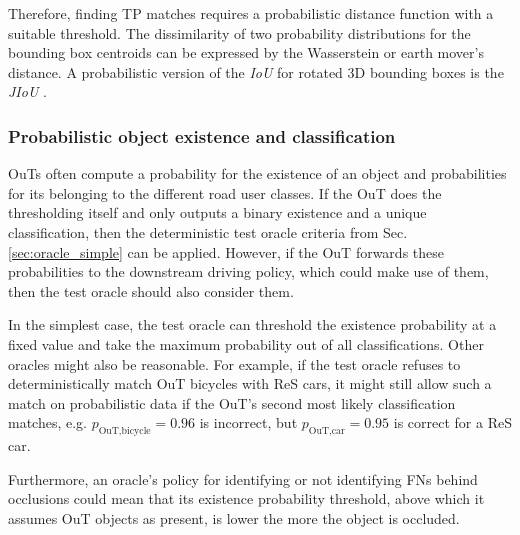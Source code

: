 \documentclass[conference]{IEEEtran}
\begin{document}
Therefore, finding TP matches requires a probabilistic distance function with a suitable threshold. 
The dissimilarity of two probability distributions for the bounding box centroids can be expressed by the Wasserstein or earth mover's distance.
A probabilistic version of the \textit{IoU} for rotated 3D bounding boxes is the \textit{JIoU} \cite{Wang2020inferring_iros}.

\subsubsection{Probabilistic object existence and classification}
\label{sec:prob_thresholding}

OuTs often compute a probability for the existence of an object and probabilities for its belonging to the different road user classes.
If the OuT does the thresholding itself and only outputs a binary existence and a unique classification, then the deterministic test oracle criteria from Sec. \ref{sec:oracle_simple} can be applied. 
However, if the OuT forwards these probabilities to the downstream driving policy, which could make use of them, then the test oracle should also consider them. 

In the simplest case, the test oracle can threshold the existence probability at a fixed value and take the maximum probability out of all classifications.
Other oracles might also be reasonable.
For example, if the test oracle refuses to deterministically match OuT bicycles with ReS cars, it might still allow such a match on probabilistic data if the OuT's second most likely classification matches, e.g. $p_\text{OuT,bicycle} = 0.96$ is incorrect, but $p_\text{OuT,car} = 0.95$ is correct for a ReS car.

Furthermore, an oracle's policy for identifying or not identifying FNs behind occlusions could mean that its existence probability threshold, above which it assumes OuT objects as present, is lower the more the object is occluded.

\end{document}
